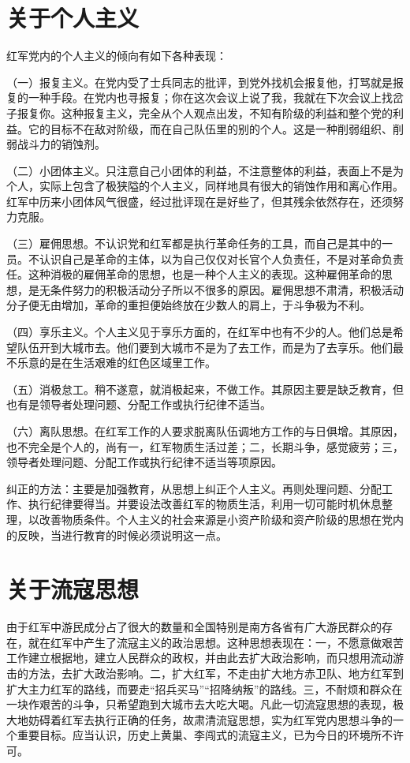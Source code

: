 \section{关于个人主义}

红军党内的个人主义的倾向有如下各种表现：

（一）报复主义。在党内受了士兵同志的批评，到党外找机会报复他，打骂就是报复的一种手段。在党内也寻报复；你在这次会议上说了我，我就在下次会议上找岔子报复你。这种报复主义，完全从个人观点出发，不知有阶级的利益和整个党的利益。它的目标不在敌对阶级，而在自己队伍里的别的个人。这是一种削弱组织、削弱战斗力的销蚀剂。

（二）小团体主义。只注意自己小团体的利益，不注意整体的利益，表面上不是为个人，实际上包含了极狭隘的个人主义，同样地具有很大的销蚀作用和离心作用。红军中历来小团体风气很盛，经过批评现在是好些了，但其残余依然存在，还须努力克服。

（三）雇佣思想。不认识党和红军都是执行革命任务的工具，而自己是其中的一员。不认识自己是革命的主体，以为自己仅仅对长官个人负责任，不是对革命负责任。这种消极的雇佣革命的思想，也是一种个人主义的表现。这种雇佣革命的思想，是无条件努力的积极活动分子所以不很多的原因。雇佣思想不肃清，积极活动分子便无由增加，革命的重担便始终放在少数人的肩上，于斗争极为不利。

（四）享乐主义。个人主义见于享乐方面的，在红军中也有不少的人。他们总是希望队伍开到大城市去。他们要到大城市不是为了去工作，而是为了去享乐。他们最不乐意的是在生活艰难的红色区域里工作。

（五）消极怠工。稍不遂意，就消极起来，不做工作。其原因主要是缺乏教育，但也有是领导者处理问题、分配工作或执行纪律不适当。

（六）离队思想。在红军工作的人要求脱离队伍调地方工作的与日俱增。其原因，也不完全是个人的，尚有一，红军物质生活过差；二，长期斗争，感觉疲劳；三，领导者处理问题、分配工作或执行纪律不适当等项原因。

纠正的方法：主要是加强教育，从思想上纠正个人主义。再则处理问题、分配工作、执行纪律要得当。并要设法改善红军的物质生活，利用一切可能时机休息整理，以改善物质条件。个人主义的社会来源是小资产阶级和资产阶级的思想在党内的反映，当进行教育的时候必须说明这一点。

\section{关于流寇思想}

由于红军中游民成分占了很大的数量和全国特别是南方各省有广大游民群众的存在，就在红军中产生了流寇主义的政治思想。这种思想表现在：一，不愿意做艰苦工作建立根据地，建立人民群众的政权，并由此去扩大政治影响，而只想用流动游击的方法，去扩大政治影响。二，扩大红军，不走由扩大地方赤卫队、地方红军到扩大主力红军的路线，而要走“招兵买马”“招降纳叛”的路线。三，不耐烦和群众在一块作艰苦的斗争，只希望跑到大城市去大吃大喝。凡此一切流寇思想的表现，极大地妨碍着红军去执行正确的任务，故肃清流寇思想，实为红军党内思想斗争的一个重要目标。应当认识，历史上黄巢、李闯式的流寇主义，已为今日的环境所不许可。

